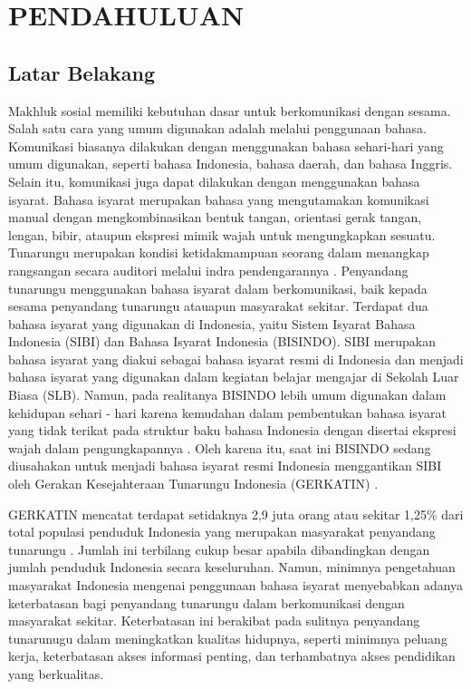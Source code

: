 \chapter{PENDAHULUAN}
\label{chap:pendahuluan}


\section{Latar Belakang}
\label{sec:latarbelakang}
Makhluk sosial memiliki kebutuhan dasar untuk berkomunikasi dengan sesama. Salah satu cara yang umum digunakan adalah melalui penggunaan bahasa. Komunikasi biasanya dilakukan dengan menggunakan bahasa sehari-hari yang umum digunakan, seperti bahasa Indonesia, bahasa daerah, dan bahasa Inggris. Selain itu, komunikasi juga dapat dilakukan dengan menggunakan bahasa isyarat. Bahasa isyarat merupakan bahasa yang mengutamakan komunikasi manual dengan mengkombinasikan bentuk tangan, orientasi gerak tangan, lengan, bibir, ataupun ekspresi mimik wajah untuk mengungkapkan sesuatu. Tunarungu merupakan kondisi ketidakmampuan seorang dalam menangkap rangsangan secara auditori melalui indra pendengarannya \parencite{maulida2017}. Penyandang tunarungu menggunakan bahasa isyarat dalam berkomunikasi, baik kepada sesama penyandang tunarungu atauapun masyarakat sekitar. Terdapat dua bahasa isyarat yang digunakan di Indonesia, yaitu Sistem Isyarat Bahasa Indonesia (SIBI) dan Bahasa Isyarat Indonesia (BISINDO). SIBI merupakan bahasa isyarat yang diakui sebagai bahasa isyarat resmi di Indonesia dan menjadi bahasa isyarat yang digunakan dalam kegiatan belajar mengajar di Sekolah Luar Biasa (SLB). Namun, pada realitanya BISINDO lebih umum digunakan dalam kehidupan sehari - hari karena kemudahan dalam pembentukan bahasa isyarat yang tidak terikat pada struktur baku bahasa Indonesia dengan disertai ekspresi wajah dalam pengungkapannya \parencite{handhika2018}. Oleh karena itu, saat ini BISINDO sedang diusahakan untuk menjadi bahasa isyarat resmi Indonesia menggantikan SIBI oleh Gerakan Kesejahteraan Tunarungu Indonesia (GERKATIN) \parencite{borman2018}.

GERKATIN mencatat terdapat setidaknya 2,9 juta orang atau sekitar 1,25\% dari total populasi penduduk Indonesia yang merupakan masyarakat penyandang tunarungu \parencite{evitasari2015}. Jumlah ini terbilang cukup besar apabila dibandingkan dengan jumlah penduduk Indonesia secara keseluruhan. Namun, minimnya pengetahuan masyarakat Indonesia mengenai penggunaan bahasa isyarat menyebabkan adanya keterbatasan bagi penyandang tunarungu dalam berkomunikasi dengan masyarakat sekitar. Keterbatasan ini berakibat pada sulitnya penyandang tunarunugu dalam meningkatkan kualitas hidupnya, seperti minimnya peluang kerja, keterbatasan akses informasi penting, dan terhambatnya akses pendidikan yang berkualitas.

